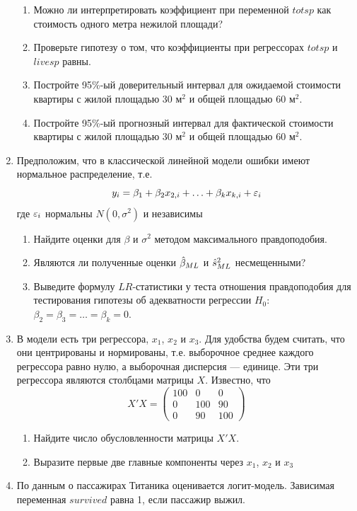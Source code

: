 \documentclass[12pt, a4paper]{article}\usepackage[]{graphicx}\usepackage[]{color}
\begin{document}
\begin{enumerate}
\begin{enumerate}
\item Можно ли интерпретировать коэффициент при переменной $totsp$ как стоимость одного метра нежилой площади?
\item Проверьте гипотезу о том, что коэффициенты при регрессорах $totsp$ и $livesp$ равны.
\item Постройте 95\%-ый доверительный интервал для ожидаемой стоимости квартиры с жилой площадью $30$ м$^2$ и общей площадью $60$ м$^2$.
\item Постройте 95\%-ый прогнозный интервал для фактической стоимости квартиры с жилой площадью $30$ м$^2$ и общей площадью $60$ м$^2$.
\end{enumerate}


\item Предположим, что в классической линейной модели ошибки имеют нормальное распределение, т.е.
\[
y_i=\beta_1+\beta_2 x_{2,i}+\ldots+\beta_k x_{k,i}+\varepsilon_i
\]
где $\varepsilon_i$ нормальны $N(0,\sigma^2)$ и независимы
\begin{enumerate}
\item Найдите оценки для $\beta$ и $\sigma^2$ методом максимального правдоподобия.
\item Являются ли полученные оценки $\hat{\beta}_{ML}$ и $\hat{s}^2_{ML}$ несмещенными?
\item Выведите формулу $LR$-статистики у теста отношения правдоподобия для тестирования гипотезы об адекватности регрессии $H_0$: $\beta_2=\beta_3=\ldots=\beta_k=0$.
\end{enumerate}


\item В модели есть три регрессора, $x_1$, $x_2$ и $x_3$. Для удобства будем считать, что они центрированы и нормированы, т.е. выборочное среднее каждого регрессора равно нулю, а выборочная дисперсия — единице. Эти три регрессора являются столбцами матрицы $X$. Известно, что
\[
X'X=\left(\begin{array}{ccc}
100 & 0 & 0 \\
0 & 100 & 90 \\
0 & 90 & 100
\end{array}\right)
\]
\begin{enumerate}
\item Найдите число обусловленности матрицы $X'X$.
\item Выразите первые две главные компоненты через $x_1$, $x_2$ и $x_3$
\end{enumerate}

\newpage
\item По данным о пассажирах Титаника оценивается логит-модель. Зависимая переменная $survived$ равна 1, если пассажир выжил.



\end{enumerate}
\end{document}
